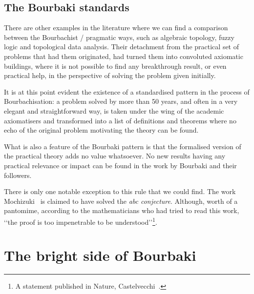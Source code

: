\documentclass[]{scrartcl}
\theoremstyle{definition}
\begin{document}
\subsection*{The Bourbaki standards}

There are other examples in the literature where we can find a comparison between the Bourbachist / pragmatic ways, such as algebraic topology, fuzzy logic and topological data analysis. Their detachment from the practical set of problems that had them originated, had turned them into convoluted axiomatic buildings, where it is not possible to find any breakthrough result, or even practical help, in the perspective of solving the problem given initially.

It is at this point evident the existence of a standardised pattern in the process of Bourbachisation: a problem solved by more than 50 years, and often in a very elegant and straightforward way, is taken under the wing of the academic axiomatisers and transformed into a list of definitions and theorems where no echo of the original problem motivating the theory can be found.


What is also a feature of the Bourbaki pattern is that the formalised version of the practical theory adds no value whatsoever. No new results having any practical relevance or impact can be found in the work by Bourbaki and their followers.

There is only one notable exception to this rule that we could find. The work Mochizuki~\cite{mochizuki2012inter} is claimed to have solved the \emph{abc conjecture}. Although, worth of a pantomime, according to the mathematicians who had tried to read this work, \lq\lq the proof is too impenetrable to be understood\rq\rq\footnote{A statement published in Nature, Castelvecchi~\cite{castelvecchi2015biggest}.}.

\section*{The bright side of Bourbaki}

\end{document}
